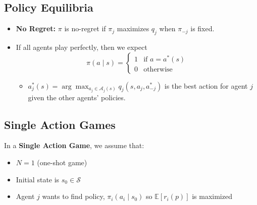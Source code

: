\subsection{Policy Equilibria}
\begin{notes}
    \begin{itemize}
        \item \textbf{No Regret:} $\pi$ is no-regret if $\pi_j$ maximizes $q_j$ when $\pi_{-j}$ is fixed. 
        \item If all agents play perfectly, then we expect
        \begin{equation*}
            \pi (a \mid s) = \begin{cases}
                1 & \text{if } a= a^*(s) \\
                0 & \text{otherwise}
            \end{cases}
        \end{equation*}
        \begin{itemize}
            \item $a_j^*(s) = \arg \max_{a_j \in \mathcal{A}_j(s)} q_j(s,a_j,a_{-j}^*)$ is the best action for agent $j$ given the other agents' policies.
        \end{itemize}
    \end{itemize}
\end{notes}
\newpage

\subsection{Single Action Games}
\begin{summary}
    In a \textbf{Single Action Game}, we assume that:
    \begin{itemize}
        \item $N=1$ (one-shot game)
        \item Initial state is $s_0 \in \mathcal{S}$
        \item Agent $j$ wants to find policy, $\pi_i (a_i \mid s_0)$ so $\mathbb{E}[r_i(p)]$ is maximized
    \end{itemize}
\end{summary}

